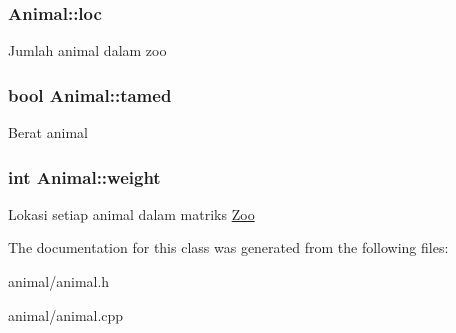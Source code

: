 \subsubsection[{\texorpdfstring{loc}{loc}}]{ Animal\+::loc\hspace{0.3cm}{\ttfamily [protected]}}\hypertarget{classAnimal_a7f26dd7aa22ec6c003e0d564fb27baa3}{}\label{classAnimal_a7f26dd7aa22ec6c003e0d564fb27baa3}
Jumlah animal dalam zoo 
\subsubsection[{\texorpdfstring{tamed}{tamed}}]{\setlength{\rightskip}{0pt plus 5cm}bool Animal\+::tamed\hspace{0.3cm}{\ttfamily [protected]}}\hypertarget{classAnimal_aa7863df489c833b29c8697d4c5a94167}{}\label{classAnimal_aa7863df489c833b29c8697d4c5a94167}
Berat animal 
\subsubsection[{\texorpdfstring{weight}{weight}}]{\setlength{\rightskip}{0pt plus 5cm}int Animal\+::weight\hspace{0.3cm}{\ttfamily [protected]}}\hypertarget{classAnimal_a9a3b22f243f7109c57f36b3c660feb6e}{}\label{classAnimal_a9a3b22f243f7109c57f36b3c660feb6e}
Lokasi setiap animal dalam matriks \hyperlink{classZoo}{Zoo} 

The documentation for this class was generated from the following files\+:\begin{DoxyCompactItemize}
\item 
animal/animal.\+h\item 
animal/animal.\+cpp\end{DoxyCompactItemize}
